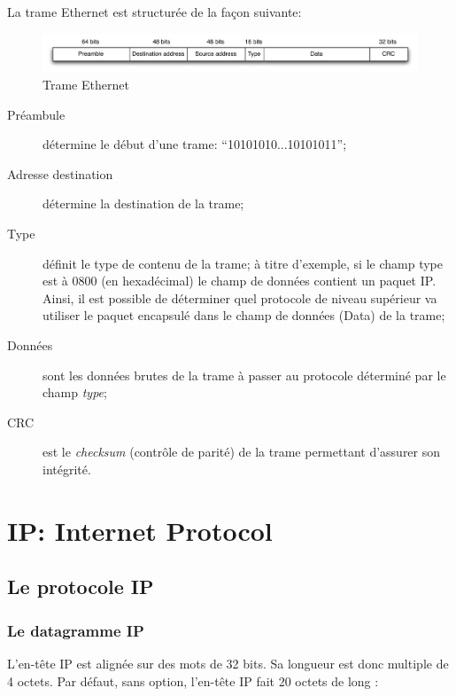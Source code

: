 \documentclass[11pt,english,french]{scrreprt}
\theoremstyle{remark}
\theoremstyle{definition}
\begin{document}
La trame Ethernet est structurée de la façon suivante:
\begin{figure}[h!]
	\center
	\includegraphics[scale=.75]{graphes/IP/Ethernet}
	\caption{Trame Ethernet}
\end{figure}

\begin{description}
	\item [Préambule] détermine le début d'une trame: “10101010...10101011”;
	\item [Adresse destination] détermine la destination de la trame;
	\item [Type] définit le type de contenu de la trame; à titre d'exemple, si le champ type est à 0800 (en hexadécimal) le champ de données contient un paquet IP. Ainsi, il est possible de déterminer quel protocole de niveau supérieur va utiliser le paquet encapsulé dans le champ de données (Data) de la trame;
	\item [Données] sont les données brutes de la trame à passer au protocole déterminé par le champ \emph{type};
	\item [CRC] est le \emph{checksum} (contrôle de parité) de la trame permettant d'assurer son intégrité.
\end {description}

\chapter{IP: Internet Protocol} %

\section{Le protocole IP} %

\subsection{Le datagramme IP} %

L'en-tête IP est alignée sur des mots de 32 bits. Sa longueur est donc multiple de 4 octets. Par défaut, sans option, l'en-tête IP fait 20 octets de long :
\end{document}
